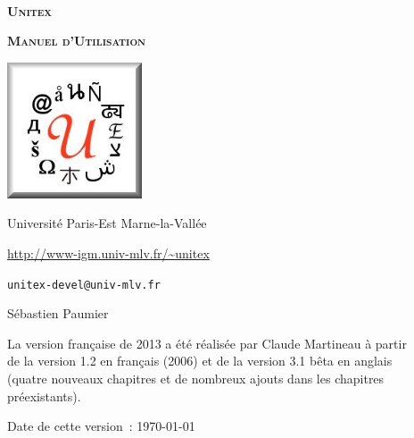 
\begin{titlepage}
\begin{center}

~

\vspace{3cm}
\Huge
\textsc{\textbf{Unitex \UnitexVersion{}}}

\vspace{1cm}

\huge
\textsc{\textbf{Manuel d'Utilisation}}

\vspace{2cm}

  \begin{center}
    \includegraphics[width=4cm]{resources/img/logo-Unitex.png}
  \end{center}
\normalsize

\vspace{2cm}

\LARGE

Université Paris-Est Marne-la-Vallée
\bigskip
\normalsize

\url{http://www-igm.univ-mlv.fr/~unitex}

\verb$unitex-devel@univ-mlv.fr$

\vspace{1cm}

Sébastien Paumier
\bigskip

La version française de 2013 a été réalisée par Claude Martineau à partir\\
de la version 1.2 en français (2006) et de la version 3.1 bêta en anglais \\
(quatre nouveaux chapitres et de nombreux ajouts dans les chapitres préexistants).
\bigskip

\mydate
Date de cette version~: \today

\end{center}

\end{titlepage}
